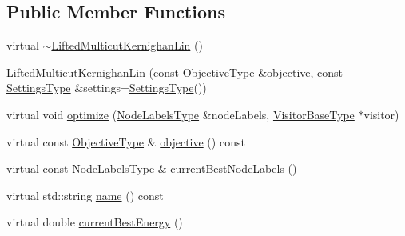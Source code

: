 \subsection*{Public Member Functions}
\begin{DoxyCompactItemize}
\item 
virtual \hyperlink{classnifty_1_1graph_1_1optimization_1_1lifted__multicut_1_1LiftedMulticutKernighanLin_a908add915a015d6127c42761d2be296d}{$\sim$\+Lifted\+Multicut\+Kernighan\+Lin} ()
\item 
\hyperlink{classnifty_1_1graph_1_1optimization_1_1lifted__multicut_1_1LiftedMulticutKernighanLin_a0383cc3b3c2be20c45039804ef0aab04}{Lifted\+Multicut\+Kernighan\+Lin} (const \hyperlink{classnifty_1_1graph_1_1optimization_1_1lifted__multicut_1_1LiftedMulticutKernighanLin_a79c92cc5c34a03b68eeedf17558b0e93}{Objective\+Type} \&\hyperlink{classnifty_1_1graph_1_1optimization_1_1lifted__multicut_1_1LiftedMulticutKernighanLin_a57c2a0d5d4b6c766170f07120c53a22e}{objective}, const \hyperlink{structnifty_1_1graph_1_1optimization_1_1lifted__multicut_1_1LiftedMulticutKernighanLin_1_1SettingsType}{Settings\+Type} \&settings=\hyperlink{structnifty_1_1graph_1_1optimization_1_1lifted__multicut_1_1LiftedMulticutKernighanLin_1_1SettingsType}{Settings\+Type}())
\item 
virtual void \hyperlink{classnifty_1_1graph_1_1optimization_1_1lifted__multicut_1_1LiftedMulticutKernighanLin_af91180c4d1653b5823021f098dc45918}{optimize} (\hyperlink{classnifty_1_1graph_1_1optimization_1_1lifted__multicut_1_1LiftedMulticutKernighanLin_a7469ffe7b497173067005bdcf091818f}{Node\+Labels\+Type} \&node\+Labels, \hyperlink{classnifty_1_1graph_1_1optimization_1_1lifted__multicut_1_1LiftedMulticutKernighanLin_aad5914ddfc4336c965ad791c0d0173fa}{Visitor\+Base\+Type} $\ast$visitor)
\item 
virtual const \hyperlink{classnifty_1_1graph_1_1optimization_1_1lifted__multicut_1_1LiftedMulticutKernighanLin_a79c92cc5c34a03b68eeedf17558b0e93}{Objective\+Type} \& \hyperlink{classnifty_1_1graph_1_1optimization_1_1lifted__multicut_1_1LiftedMulticutKernighanLin_a57c2a0d5d4b6c766170f07120c53a22e}{objective} () const 
\item 
virtual const \hyperlink{classnifty_1_1graph_1_1optimization_1_1lifted__multicut_1_1LiftedMulticutKernighanLin_a7469ffe7b497173067005bdcf091818f}{Node\+Labels\+Type} \& \hyperlink{classnifty_1_1graph_1_1optimization_1_1lifted__multicut_1_1LiftedMulticutKernighanLin_a7d10c148bc703c6b99041b659144454d}{current\+Best\+Node\+Labels} ()
\item 
virtual std\+::string \hyperlink{classnifty_1_1graph_1_1optimization_1_1lifted__multicut_1_1LiftedMulticutKernighanLin_a39c9b8f4ffa630538f76929e7f32d3e6}{name} () const 
\item 
virtual double \hyperlink{classnifty_1_1graph_1_1optimization_1_1lifted__multicut_1_1LiftedMulticutKernighanLin_addb4bc6f2f4a63ea8afef98bc26860ed}{current\+Best\+Energy} ()
\end{DoxyCompactItemize}


